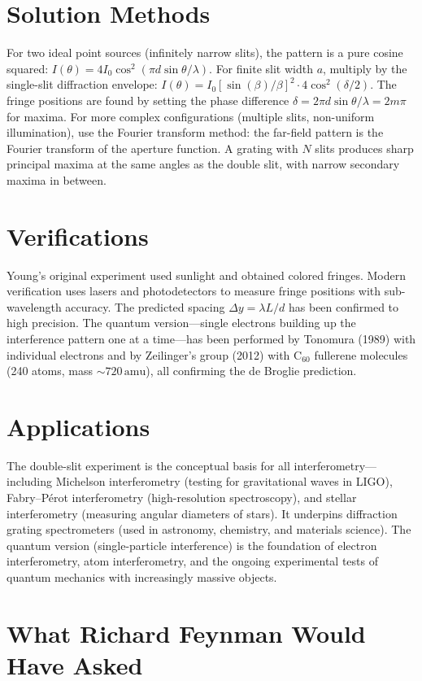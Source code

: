 \documentclass[11pt,openright]{book}
\begin{document}
\section*{Solution Methods}

For two ideal point sources (infinitely narrow slits), the pattern is a pure cosine squared: $I(\theta) = 4I_0\cos^2(\pi d\sin\theta/\lambda)$. For finite slit width $a$, multiply by the single-slit diffraction envelope: $I(\theta) = I_0[\sin(\beta)/\beta]^2 \cdot 4\cos^2(\delta/2)$. The fringe positions are found by setting the phase difference $\delta = 2\pi d\sin\theta/\lambda = 2m\pi$ for maxima. For more complex configurations (multiple slits, non-uniform illumination), use the Fourier transform method: the far-field pattern is the Fourier transform of the aperture function. A grating with $N$ slits produces sharp principal maxima at the same angles as the double slit, with narrow secondary maxima in between.
\section*{Verifications}

Young's original experiment used sunlight and obtained colored fringes. Modern verification uses lasers and photodetectors to measure fringe positions with sub-wavelength accuracy. The predicted spacing $\Delta y = \lambda L/d$ has been confirmed to high precision. The quantum version---single electrons building up the interference pattern one at a time---has been performed by Tonomura (1989) with individual electrons and by Zeilinger's group (2012) with C$_{60}$ fullerene molecules (240 atoms, mass $\sim 720\,\text{amu}$), all confirming the de Broglie prediction.
\section*{Applications}

The double-slit experiment is the conceptual basis for all interferometry---including Michelson interferometry (testing for gravitational waves in LIGO), Fabry--Pérot interferometry (high-resolution spectroscopy), and stellar interferometry (measuring angular diameters of stars). It underpins diffraction grating spectrometers (used in astronomy, chemistry, and materials science). The quantum version (single-particle interference) is the foundation of electron interferometry, atom interferometry, and the ongoing experimental tests of quantum mechanics with increasingly massive objects.
\section*{What Richard Feynman Would Have Asked}
\end{document}
